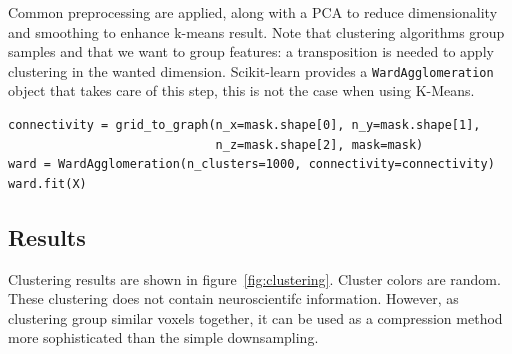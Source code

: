 \documentclass{frontiersSCNS} %
\newcounter{x}
\newcounter{y}
\newcounter{z}
\begin{document}
Common preprocessing are applied, along with a PCA to reduce dimensionality and
smoothing to enhance k-means result. Note that clustering algorithms group
samples and that we want to group features: a transposition is needed to apply
clustering in the wanted dimension. Scikit-learn provides a
\texttt{WardAgglomeration} object that takes care of this step, this is not the
case when using K-Means.

\begin{lstlisting}
connectivity = grid_to_graph(n_x=mask.shape[0], n_y=mask.shape[1],
                             n_z=mask.shape[2], mask=mask)
ward = WardAgglomeration(n_clusters=1000, connectivity=connectivity)
ward.fit(X)
\end{lstlisting}

\subsection{Results}

Clustering results are shown in figure~\ref{fig:clustering}. Cluster colors are
random. These clustering does not contain neuroscientifc information. However,
as clustering group similar voxels together, it can be used as a compression
method more sophisticated than the simple downsampling.
\end{document}
